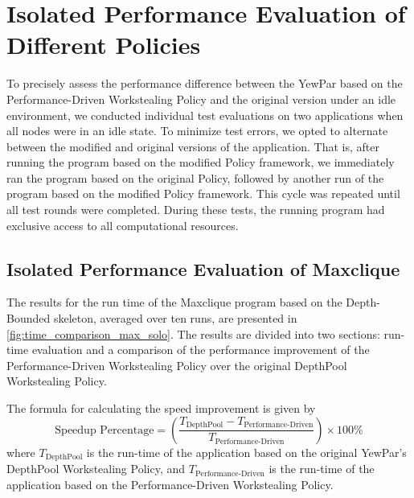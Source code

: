 \documentclass{mproj}
\begin{document}
\section{Isolated Performance Evaluation of Different Policies}

To precisely assess the performance difference between the YewPar based on the Performance-Driven Workstealing Policy and the original version under an idle environment,
we conducted individual test evaluations on two applications when all nodes were in an idle state.
To minimize test errors,
we opted to alternate between the modified and original versions of the application.
That is, after running the program based on the modified Policy framework,
we immediately ran the program based on the original Policy,
followed by another run of the program based on the modified Policy framework.
This cycle was repeated until all test rounds were completed.
During these tests, the running program had exclusive access to all computational resources.

\subsection{Isolated Performance Evaluation of Maxclique}

The results for the run time of the Maxclique program based on the Depth-Bounded skeleton, averaged over ten runs, are presented in \cref{fig:time_comparison_max_solo}.
The results are divided into two sections: run-time evaluation and a comparison of the performance improvement of the Performance-Driven Workstealing Policy over the original DepthPool Workstealing Policy.

The formula for calculating the speed improvement is given by
\begin{equation}
    \text{Speedup Percentage} = \left( \frac{T_{\text{DepthPool}} - T_{\text{Performance-Driven}}}{T_{\text{Performance-Driven}}} \right) \times 100\%
\end{equation}
where \( T_{\text{DepthPool}} \) is the run-time of the application based on the original YewPar's DepthPool Workstealing Policy,
and \( T_{\text{Performance-Driven}} \) is the run-time of the application based on the Performance-Driven Workstealing Policy.
\end{document}
